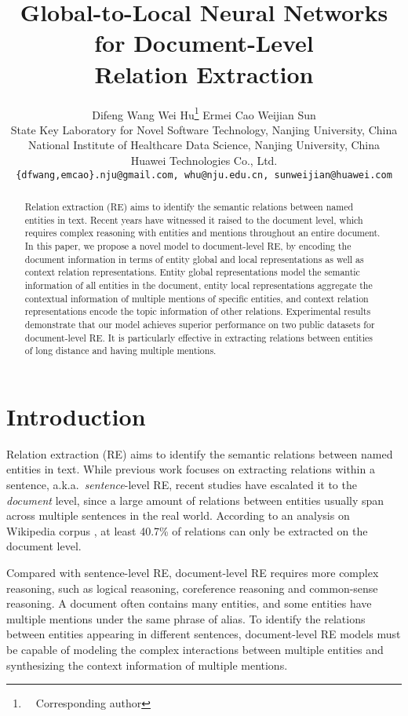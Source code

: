 \documentclass[11pt,a4paper]{article}
\title{Global-to-Local Neural Networks for Document-Level\\ Relation Extraction}
\author{Difeng Wang \quad Wei Hu\thanks{\ \ Corresponding author} \quad Ermei Cao \quad Weijian Sun\\
	 State Key Laboratory for Novel Software Technology, Nanjing University, China \\
	 National Institute of Healthcare Data Science, Nanjing University, China\\
	 Huawei Technologies Co., Ltd. \\
	\texttt{\{dfwang,emcao\}.nju@gmail.com,\,whu@nju.edu.cn,\,sunweijian@huawei.com} 
}
\date{}
\begin{document}
\maketitle

\begin{abstract}
Relation extraction (RE) aims to identify the semantic relations between named entities in text. Recent years have witnessed it raised to the document level, which requires complex reasoning with entities and mentions throughout an entire document. In this paper, we propose a novel model to document-level RE, by encoding the document information in terms of entity global and local representations as well as context relation representations. Entity global representations model the semantic information of all entities in the document, entity local representations aggregate the contextual information of multiple mentions of specific entities, and context relation representations encode the topic information of other relations. Experimental results demonstrate that our model achieves superior performance on two public datasets for document-level RE. It is particularly effective in extracting relations between entities of long distance and having multiple mentions.
\end{abstract}

\section{Introduction}

Relation extraction (RE) aims to identify the semantic relations between named entities in text. While previous work \cite{zeng2014relation,zhang2015bidirectional,zhang2018graph} focuses on extracting relations within a sentence, a.k.a.~\emph{sentence}-level RE, recent studies \cite{verga2018simultaneously,christopoulou2019connecting,sahu2019inter,yao2019docred} have escalated it to the \emph{document} level, since a large amount of relations between entities usually span across multiple sentences in the real world. According to an analysis on Wikipedia corpus \cite{yao2019docred}, at least 40.7\% of relations can only be extracted on the document level.

Compared with sentence-level RE, document-level RE requires more complex reasoning, such as logical reasoning, coreference reasoning and common-sense reasoning. A document often contains many entities, and some entities have multiple mentions under the same phrase of alias. To identify the relations between entities appearing in different sentences, document-level RE models must be capable of modeling the complex interactions between multiple entities and synthesizing the context information of multiple mentions. 
\end{document}
